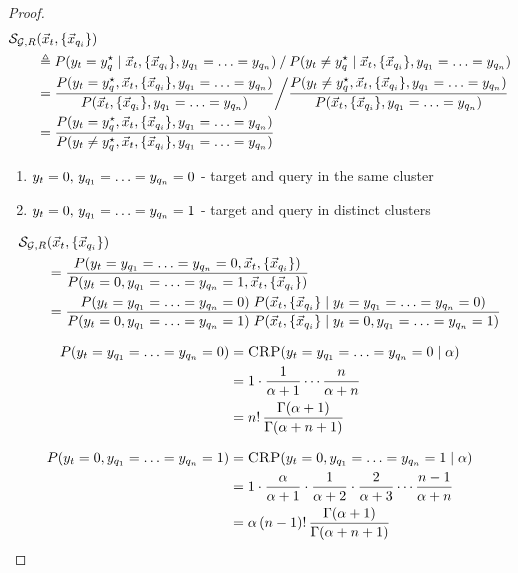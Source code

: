 \documentclass{article}
\theoremstyle{break}
\begin{document}
    \begin{proof}     
      \begin{align}
        \label{eq:rscore}
        \mathcal{S}_{\mathcal{G}, R} &(\vec x_t, \{{\vec x_{q_i}}\}) \\
        & \triangleq P(y_t = y_q^{\star} \mid \vec x_t, \{{\vec x_{q_i}}\}, y_{q_1}=\ldots=y_{q_n})
            \mathbin{/} P(y_t \neq y_q^{\star} \mid \vec x_t, \{{\vec x_{q_i}}\}, y_{q_1}=\ldots=y_{q_n}) \\
        &= \frac {P(y_t = y_q^{\star}, \vec x_t, \{{\vec x_{q_i}}\}, y_{q_1}=\ldots=y_{q_n})}
            {P(\vec x_t, \{{\vec x_{q_i}}\}, y_{q_1}=\ldots=y_{q_n})} \bigg{/}
            \frac {P(y_t \neq y_q^{\star}, \vec x_t, \{{\vec x_{q_i}}\}, y_{q_1}=\ldots=y_{q_n})}
            {P(\vec x_t, \{{\vec x_{q_i}}\}, y_{q_1}=\ldots=y_{q_n})} \\
        &= \frac {P(y_t = y_q^{\star}, \vec x_t, \{{\vec x_{q_i}}\}, y_{q_1}=\ldots=y_{q_n})}
            {P(y_t \neq y_q^{\star}, \vec x_t, \{{\vec x_{q_i}}\}, y_{q_1}=\ldots=y_{q_n})}\\
      \end{align}
      
      \begin{enumerate}
      \item $y_t=0,\, y_{q_1}=\ldots=y_{q_n} = 0$ - target and query in the same cluster
      \item $y_t=0,\, y_{q_1}=\ldots=y_{q_n} = 1$ - target and query in distinct clusters
      \end{enumerate}

      \begin{align}
        \mathcal{S}_{\mathcal{G}, R} &(\vec x_t, \{{\vec x_{q_i}}\}) \\
        &= \frac 
            {P(y_t = y_{q_1}=\ldots=y_{q_n} = 0, \vec x_t, \{{\vec x_{q_i}}\})}
            {P(y_t = 0, y_{q_1}=\ldots=y_{q_n} = 1, \vec x_t, \{{\vec x_{q_i}}\})}\\
        &= \frac{P(y_t = y_{q_1}=\ldots=y_{q_n} = 0) \;
            P(\vec x_t, \{{\vec x_{q_i}}\} \mid y_t = y_{q_1}=\ldots=y_{q_n} = 0)}
            {P(y_t = 0, y_{q_1}=\ldots=y_{q_n} = 1) \;
            P(\vec x_t, \{{\vec x_{q_i}}\} \mid y_t = 0, y_{q_1}=\ldots=y_{q_n} = 1)}
      \end{align}

      \begin{align}
        P(y_t = y_{q_1}=\ldots=y_{q_n} = 0) &= \textsc{CRP}(y_t = y_{q_1}=\ldots=y_{q_n} = 0 \mid \alpha) \\
        &=1 \cdot \frac{1}{\alpha + 1} \cdots 
            \frac{n}{\alpha+n}\\
        &= n! \, \frac{\Gamma(\alpha+1)}{\Gamma(\alpha+n+1)}
      \end{align}

      \begin{align}
        P(y_t = 0, y_{q_1}=\ldots=y_{q_n} = 1) &= \textsc{CRP}(y_t = 0, y_{q_1}=\ldots=y_{q_n} = 1 \mid \alpha) \\
        &=1 \cdot \frac{\alpha}{\alpha + 1} \cdot \frac{1}{\alpha+2} \cdot
            \frac{2}{\alpha+3} \cdots \frac{n-1}{\alpha+n}\\
        &= \alpha \, (n-1)! \, \frac{\Gamma(\alpha+1)}{\Gamma(\alpha+n+1)}
      \end{align}


\end{proof}
\end{document}
